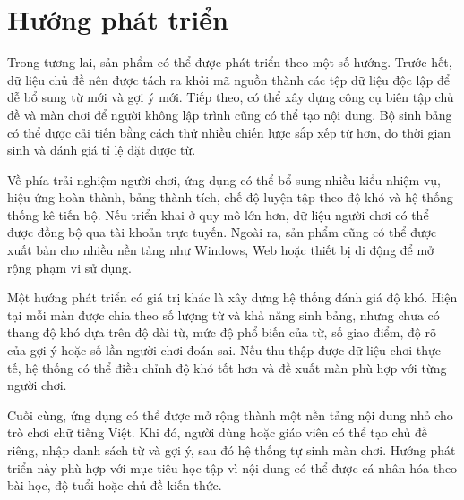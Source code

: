 \documentclass[../DoAn.tex]{subfiles}
\begin{document}
\section{Hướng phát triển}
Trong tương lai, sản phẩm có thể được phát triển theo một số hướng. Trước hết, dữ liệu chủ đề nên được tách ra khỏi mã nguồn thành các tệp dữ liệu độc lập để dễ bổ sung từ mới và gợi ý mới. Tiếp theo, có thể xây dựng công cụ biên tập chủ đề và màn chơi để người không lập trình cũng có thể tạo nội dung. Bộ sinh bảng có thể được cải tiến bằng cách thử nhiều chiến lược sắp xếp từ hơn, đo thời gian sinh và đánh giá tỉ lệ đặt được từ.

Về phía trải nghiệm người chơi, ứng dụng có thể bổ sung nhiều kiểu nhiệm vụ, hiệu ứng hoàn thành, bảng thành tích, chế độ luyện tập theo độ khó và hệ thống thống kê tiến bộ. Nếu triển khai ở quy mô lớn hơn, dữ liệu người chơi có thể được đồng bộ qua tài khoản trực tuyến. Ngoài ra, sản phẩm cũng có thể được xuất bản cho nhiều nền tảng như Windows, Web hoặc thiết bị di động để mở rộng phạm vi sử dụng.

Một hướng phát triển có giá trị khác là xây dựng hệ thống đánh giá độ khó. Hiện tại mỗi màn được chia theo số lượng từ và khả năng sinh bảng, nhưng chưa có thang độ khó dựa trên độ dài từ, mức độ phổ biến của từ, số giao điểm, độ rõ của gợi ý hoặc số lần người chơi đoán sai. Nếu thu thập được dữ liệu chơi thực tế, hệ thống có thể điều chỉnh độ khó tốt hơn và đề xuất màn phù hợp với từng người chơi.

Cuối cùng, ứng dụng có thể được mở rộng thành một nền tảng nội dung nhỏ cho trò chơi chữ tiếng Việt. Khi đó, người dùng hoặc giáo viên có thể tạo chủ đề riêng, nhập danh sách từ và gợi ý, sau đó hệ thống tự sinh màn chơi. Hướng phát triển này phù hợp với mục tiêu học tập vì nội dung có thể được cá nhân hóa theo bài học, độ tuổi hoặc chủ đề kiến thức.

\end{document}
